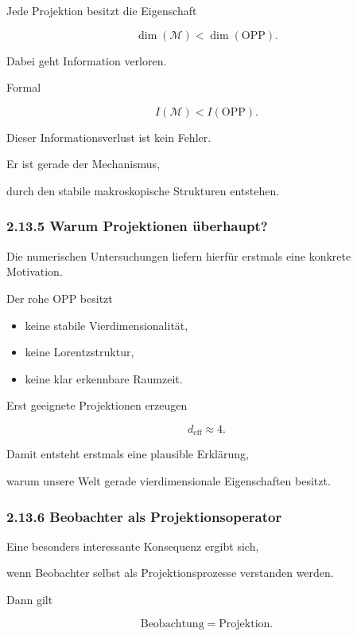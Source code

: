 Jede Projektion besitzt die Eigenschaft

\[
\dim(\mathcal M)
<
\dim(\mathrm{OPP}).
\]

Dabei geht Information verloren.

Formal

\[
I(\mathcal M)
<
I(\mathrm{OPP}).
\]

Dieser Informationsverlust ist kein Fehler.

Er ist gerade der Mechanismus,

durch den stabile makroskopische Strukturen entstehen.


\subsubsection*{2.13.5 Warum Projektionen überhaupt?}

Die numerischen Untersuchungen liefern hierfür erstmals eine konkrete Motivation.

Der rohe OPP besitzt

\begin{itemize}
\item keine stabile Vierdimensionalität,
\item keine Lorentzstruktur,
\item keine klar erkennbare Raumzeit.
\end{itemize}

Erst geeignete Projektionen erzeugen

\[
d_{\mathrm{eff}}
\approx
4.
\]

Damit entsteht erstmals eine plausible Erklärung,

warum unsere Welt gerade vierdimensionale Eigenschaften besitzt.


\subsubsection*{2.13.6 Beobachter als Projektionsoperator}

Eine besonders interessante Konsequenz ergibt sich,

wenn Beobachter selbst als Projektionsprozesse verstanden werden.

Dann gilt

\[
\boxed{
\text{Beobachtung}
=
\text{Projektion}.
}
\]


